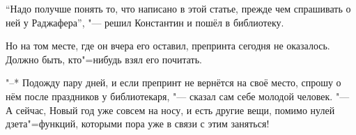 \enquote{Надо получше понять то, что написано в этой статье, прежде чем
спрашивать о ней у Раджафера}, "--- решил Константин и пошёл в библиотеку.

Но на том месте, где он вчера его оставил, препринта сегодня не оказалось.
Должно быть, кто"=нибудь взял его почитать.

"--* Подожду пару дней, и если препринт не вернётся на своё место, спрошу о нём
после праздников у библиотекаря, "--- сказал сам себе молодой человек.
"--- А сейчас, Новый год уже совсем на носу, и есть другие вещи, помимо нулей
дзета"=функций, которыми пора уже в связи с этим заняться!
